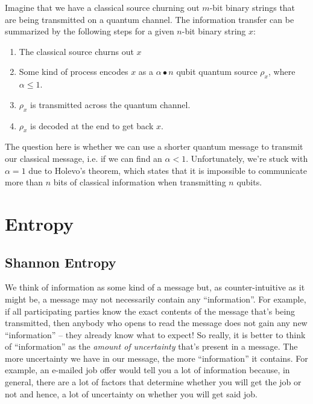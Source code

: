 \documentclass[11pt]{article}
\begin{document}
\noindent Imagine that we have a classical source churning out $m$-bit binary strings that are being transmitted on a quantum channel. The information transfer can be summarized by the following steps for a given $n$-bit binary string $x$:
\begin{enumerate}
\item The classical source churns out $x$

\item Some kind of process encodes $x$ as a $\alpha\bullet n$ qubit quantum source $\rho_x$, where $\alpha \leq 1$.

\item $\rho_x$ is transmitted across the quantum channel.

\item $\rho_x$ is decoded at the end to get back $x$.
\end{enumerate}
The question here is whether we can use a shorter quantum message to transmit our classical message, i.e. if we can find an $\alpha < 1$. Unfortunately, we're stuck with $\alpha = 1$ due to Holevo's theorem, which states that it is impossible to communicate more than $n$ bits of classical information when transmitting $n$ qubits.

\section{Entropy}

\subsection{Shannon Entropy}
We think of information as some kind of a message but, as counter-intuitive as it might be, a message may not necessarily contain any ``information''. For example, if all participating parties know the exact contents of the message that's being transmitted, then anybody who opens to read the message does not gain any new ``information'' -- they already know what to expect! So really, it is better to think of ``information'' as the \emph{amount of uncertainty} that's present in a message. The more uncertainty we have in our message, the more ``information'' it contains. For example, an e-mailed job offer would tell you a lot of information because, in general, there are a lot of factors that determine whether you will get the job or not and hence, a lot of uncertainty on whether you will get said job.
\end{document}
